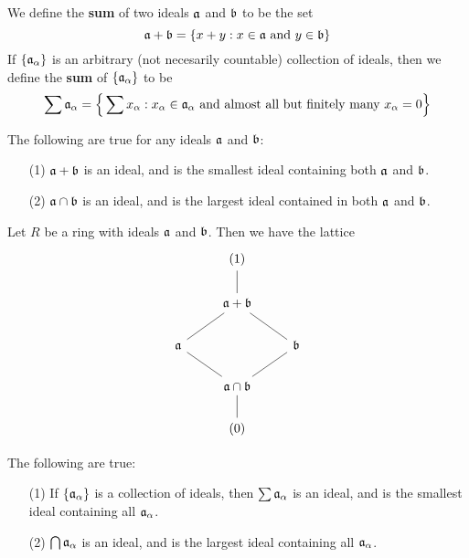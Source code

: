 \begin{definition}
  We define the \textbf{sum} of two ideals $\af$ and  $\bf$ to be the set
  \begin{equation*}
    \af+\bf=\{x+y : x \in \af \text{ and } y \in \bf\}
  \end{equation*}
  If $\{\af_\a\}$ is an arbitrary (not necesarily countable) collection of
  ideals, then we define the \textbf{sum} of $\{\af_\a\}$ to be
  \begin{equation*}
    \sum{\af_\a}=
    \Big{\{} \sum{x_\a} : x_\a \in \af_\a \text{ and almost all but finitely
    many } x_\a=0 \Big{\}}
  \end{equation*}
\end{definition}

\begin{lemma}\label{lemma_5.5.5}
  The following are true for any ideals $\af$ and $\bf$:
  \begin{enumerate}
    \item[(1)] $\af+\bf$ is an ideal, and is the smallest ideal containing both
      $\af$ and  $\bf$.

    \item[(2)] $\af \cap \bf$ is an ideal, and is the largest ideal
      contained in both $\af$ and $\bf$.
  \end{enumerate}
\end{lemma}
\begin{corollary}
  Let $R$ be a ring with ideals $\af$ and $\bf$. Then we have the lattice
  \[\begin{tikzcd}
  & (1) \\
  & {\af+\bf} \\
    \af && \bf \\
        & \af \cap \bf \\
        & {(0)}
        \arrow[no head, from=1-2, to=2-2]
        \arrow[no head, from=2-2, to=3-1]
        \arrow[no head, from=3-1, to=4-2]
        \arrow[no head, from=4-2, to=3-3]
        \arrow[no head, from=3-3, to=2-2]
        \arrow[no head, from=4-2, to=5-2]
  \end{tikzcd}\]
\end{corollary}
\begin{corollary}
  The following are true:
  \begin{enumerate}
    \item[(1)] If $\{\af_\a\}$ is a collection of ideals, then $\sum{\af_\a}$ is
      an ideal, and is the smallest ideal containing all $\af_\a$.

    \item[(2)] $\bigcap{\af_\a}$ is an ideal, and is the largest ideal
      containing all $\af_\a$.
  \end{enumerate}
\end{corollary}

